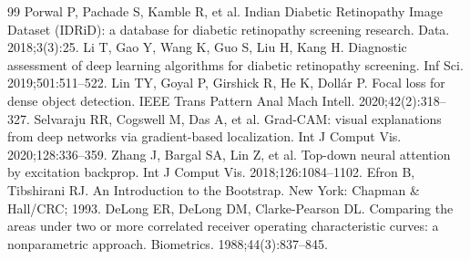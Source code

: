 \documentclass[11pt,a4paper]{article}
\begin{document}
\begin{thebibliography}{99}
 Porwal P, Pachade S, Kamble R, et al. Indian Diabetic Retinopathy Image Dataset (IDRiD): a database for diabetic retinopathy screening research. Data. 2018;3(3):25.
 Li T, Gao Y, Wang K, Guo S, Liu H, Kang H. Diagnostic assessment of deep learning algorithms for diabetic retinopathy screening. Inf Sci. 2019;501:511--522.
 Lin TY, Goyal P, Girshick R, He K, Doll\'ar P. Focal loss for dense object detection. IEEE Trans Pattern Anal Mach Intell. 2020;42(2):318--327.
 Selvaraju RR, Cogswell M, Das A, et al. Grad-CAM: visual explanations from deep networks via gradient-based localization. Int J Comput Vis. 2020;128:336--359.
 Zhang J, Bargal SA, Lin Z, et al. Top-down neural attention by excitation backprop. Int J Comput Vis. 2018;126:1084--1102.
 Efron B, Tibshirani RJ. An Introduction to the Bootstrap. New York: Chapman \& Hall/CRC; 1993.
 DeLong ER, DeLong DM, Clarke-Pearson DL. Comparing the areas under two or more correlated receiver operating characteristic curves: a nonparametric approach. Biometrics. 1988;44(3):837--845.
\end{thebibliography}
\end{document}
